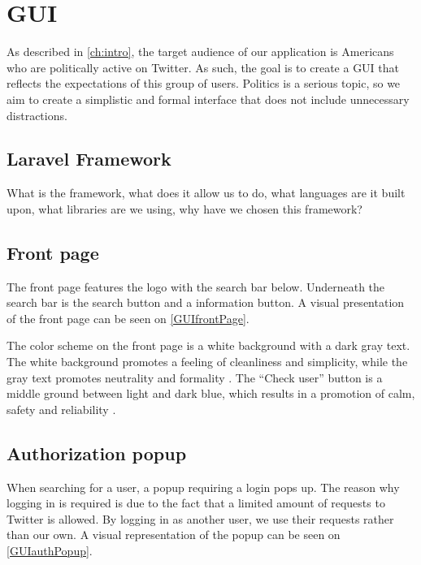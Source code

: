 \chapter{GUI} \label{GUI}
As described in \autoref{ch:intro}, the target audience of our application is
Americans who are politically active on Twitter. As such, the goal is to create
a GUI that reflects the expectations of this group of users. Politics is a serious
topic, so we aim to create a simplistic and formal interface that does not
include unnecessary distractions.

\section{Laravel Framework}\label{sec:laravel}
What is the framework, what does it allow us to do, what languages are it built
upon, what libraries are we using, why have we chosen this framework?

\section{Front page}
The front page features the logo with the search bar below. Underneath the
search bar is the search button and a information button. A visual presentation
of the front page can be seen on \autoref{GUIfrontPage}.

{}

The color scheme on the front page is a white background with a dark gray text.
The white background promotes a feeling of cleanliness and simplicity, while the
gray text promotes neutrality and formality \citep[p. 63 \& 64]{WebUI}. 
The ``Check user'' button is a middle ground between light and dark blue, which
results in a promotion of calm, safety and reliability \citep[p. 61]{WebUI}.

\section{Authorization popup}

When searching for a user, a popup requiring a login pops up. The reason why
logging in is required is due to the fact that a limited amount of requests to
Twitter is allowed. By logging in as another user, we use their requests rather
than our own. A visual representation of the popup can be seen on
\autoref{GUIauthPopup}.

